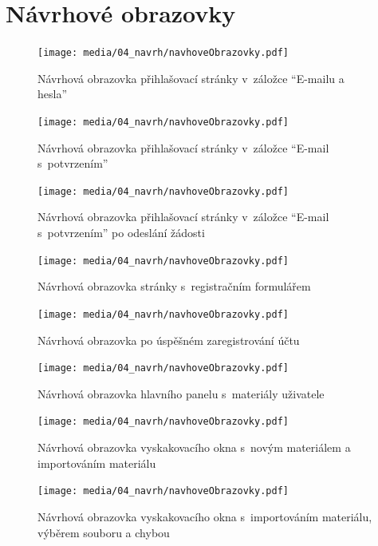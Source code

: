 \chapter{Návrhové obrazovky}\label{appendix:navrhoveObrazovky}



\begin{figure}[ht!]
    \centering
    \texttt{[image: media/04\_navrh/navhoveObrazovky.pdf]}
    \caption{Návrhová obrazovka přihlašovací stránky v~záložce \enquote{E-mailu a hesla}}
\end{figure}

\begin{figure}[ht!]
    \centering
    \texttt{[image: media/04\_navrh/navhoveObrazovky.pdf]}
    \caption{Návrhová obrazovka přihlašovací stránky v~záložce \enquote{E-mail s~potvrzením}}
\end{figure}

\begin{figure}[ht!]
    \centering
    \texttt{[image: media/04\_navrh/navhoveObrazovky.pdf]}
    \caption{Návrhová obrazovka přihlašovací stránky v~záložce \enquote{E-mail s~potvrzením} po odeslání žádosti}
\end{figure}



\begin{figure}[ht!]
    \centering
    \texttt{[image: media/04\_navrh/navhoveObrazovky.pdf]}
    \caption{Návrhová obrazovka stránky s~registračním formulářem}
\end{figure}

\begin{figure}[ht!]
    \centering
    \texttt{[image: media/04\_navrh/navhoveObrazovky.pdf]}
    \caption{Návrhová obrazovka po úspěšném zaregistrování účtu}
\end{figure}

\begin{figure}[ht!]
    \centering
    \texttt{[image: media/04\_navrh/navhoveObrazovky.pdf]}
    \caption{Návrhová obrazovka hlavního panelu s~materiály uživatele}
\end{figure}

\begin{figure}[ht!]
    \centering
    \texttt{[image: media/04\_navrh/navhoveObrazovky.pdf]}
    \caption{Návrhová obrazovka vyskakovacího okna s~novým materiálem a importováním materiálu}
\end{figure}

\begin{figure}[ht!]
    \centering
    \texttt{[image: media/04\_navrh/navhoveObrazovky.pdf]}
    \caption{Návrhová obrazovka vyskakovacího okna s~importováním materiálu, výběrem souboru a chybou}
\end{figure}


